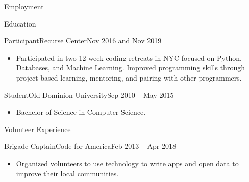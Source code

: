 \documentclass[]{mcdowellcv}
\begin{document}
\begin{cvsection}{Employment}
    \end{cvsection}

    \begin{cvsection}{Education}
        \begin{cvsubsection}{Participant}{Recurse Center}{Nov 2016 and Nov 2019}
            \begin{itemize}
                \item Participated in two 12-week coding retreats in NYC focused on Python, Databases, and Machine Learning.
                Improved programming skills through project based learning, mentoring, and pairing with other programmers.
            \end{itemize}
        \end{cvsubsection}
        \begin{cvsubsection}{Student}{Old Dominion University}{Sep 2010 – May 2015}
            \begin{itemize}
                \item Bachelor of Science in Computer Science.  ---------------------  
            \end{itemize}
        \end{cvsubsection}
    \end{cvsection}

    \begin{cvsection}{Volunteer Experience}
        \begin{cvsubsection}{Brigade Captain}{Code for America}{Feb 2013 – Apr 2018}
            \begin{itemize}
                \item Organized volunteers to use technology to write apps and open data to improve their local communities.
            \end{itemize}

        \end{cvsubsection}

    \end{cvsection}
\end{document}
